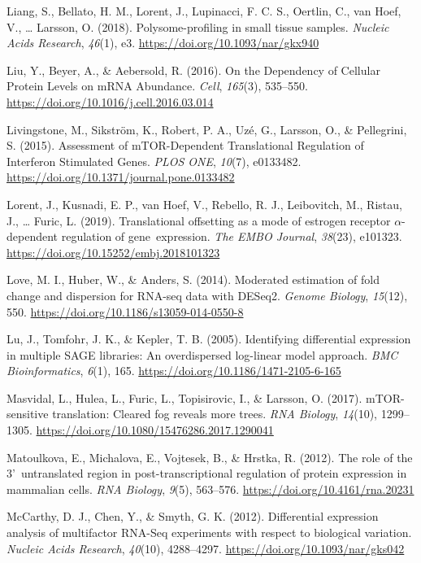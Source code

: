 \documentclass[12pt,openany]{book}
\begin{document}
\hypertarget{ref-Liang2018}{}
Liang, S., Bellato, H. M., Lorent, J., Lupinacci, F. C. S., Oertlin, C.,
van Hoef, V., \ldots{} Larsson, O. (2018). Polysome-profiling in small
tissue samples. \emph{Nucleic Acids Research}, \emph{46}(1), e3.
\url{https://doi.org/10.1093/nar/gkx940}

\hypertarget{ref-Liu2016}{}
Liu, Y., Beyer, A., \& Aebersold, R. (2016). On the Dependency of
Cellular Protein Levels on mRNA Abundance. \emph{Cell}, \emph{165}(3),
535--550. \url{https://doi.org/10.1016/j.cell.2016.03.014}

\hypertarget{ref-Livingstone2015}{}
Livingstone, M., Sikström, K., Robert, P. A., Uzé, G., Larsson, O., \&
Pellegrini, S. (2015). Assessment of mTOR-Dependent Translational
Regulation of Interferon Stimulated Genes. \emph{PLOS ONE},
\emph{10}(7), e0133482.
\url{https://doi.org/10.1371/journal.pone.0133482}

\hypertarget{ref-Lorent2019}{}
Lorent, J., Kusnadi, E. P., van Hoef, V., Rebello, R. J., Leibovitch,
M., Ristau, J., \ldots{} Furic, L. (2019). Translational offsetting as a
mode of estrogen receptor \(\alpha\)-dependent regulation of
gene~expression. \emph{The EMBO Journal}, \emph{38}(23), e101323.
\url{https://doi.org/10.15252/embj.2018101323}

\hypertarget{ref-Love2014}{}
Love, M. I., Huber, W., \& Anders, S. (2014). Moderated estimation of
fold change and dispersion for RNA-seq data with DESeq2. \emph{Genome
Biology}, \emph{15}(12), 550.
\url{https://doi.org/10.1186/s13059-014-0550-8}

\hypertarget{ref-Lu2005}{}
Lu, J., Tomfohr, J. K., \& Kepler, T. B. (2005). Identifying
differential expression in multiple SAGE libraries: An overdispersed
log-linear model approach. \emph{BMC Bioinformatics}, \emph{6}(1), 165.
\url{https://doi.org/10.1186/1471-2105-6-165}

\hypertarget{ref-Masvidal2017}{}
Masvidal, L., Hulea, L., Furic, L., Topisirovic, I., \& Larsson, O.
(2017). mTOR-sensitive translation: Cleared fog reveals more trees.
\emph{RNA Biology}, \emph{14}(10), 1299--1305.
\url{https://doi.org/10.1080/15476286.2017.1290041}

\hypertarget{ref-Matoulkova2012}{}
Matoulkova, E., Michalova, E., Vojtesek, B., \& Hrstka, R. (2012). The
role of the 3'~untranslated region in post-transcriptional regulation of
protein expression in mammalian cells. \emph{RNA Biology}, \emph{9}(5),
563--576. \url{https://doi.org/10.4161/rna.20231}

\hypertarget{ref-McCarthy2012}{}
McCarthy, D. J., Chen, Y., \& Smyth, G. K. (2012). Differential
expression analysis of multifactor RNA-Seq experiments with respect to
biological variation. \emph{Nucleic Acids Research}, \emph{40}(10),
4288--4297. \url{https://doi.org/10.1093/nar/gks042}
\end{document}
